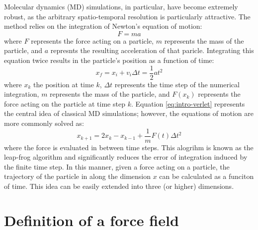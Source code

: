 Molecular dynamics (MD) simulations, in particular, have become extremely robust, as the arbitrary spatio-temporal resolution is particularly attractive. 
The method relies on the integration of Newton's equation of motion: 
\begin{equation}
    F = m a 
\end{equation}
where $F$ represents the force acting on a particle, $m$ represents the mass of the particle, and $a$ represnts the resulting acceleration of that paricle. 
Integrating this equation twice results in the particle's position as a function of time: 
\begin{equation}
    x_f = x_i + v_i \Delta t = \frac{1}{2} a t^2
    \label{eq:intro-verlet}
\end{equation}
where $x_k$ the position at time $k$,  $\Delta t$ represents the time step of the numerical integration, $m$ represents the mass of the particle, and $F(x_k)$ represents the force acting on the particle at time step $k$. 
Equation \ref{eq:intro-verlet} represents the central idea of classical MD simulations; 
however, the equations of motion are more commonly solved as: 
\begin{equation}
    x_{k+1} = 2 x_k - x_{k-1} + \frac{1}{m} F(t)\Delta t^2
    \label{eq:intro-leapfrog}
\end{equation}
where the force is evaluated in between time steps. 
This alogrihm is known as the leap-frog algorithm and significantly reduces the error of integration induced by the finite time step. 
In this manner, given a force acting on a particle, the trajectory of the particle in along the dimension $x$ can be calculated as a funciton of time. 
This idea can be easily extended into three (or higher) dimensions. 

\section{Definition of a force field}

